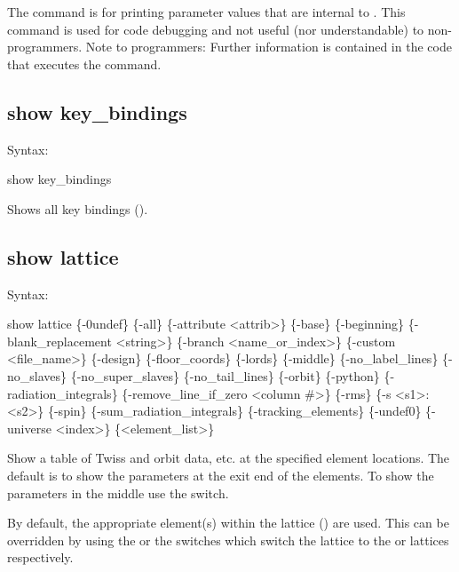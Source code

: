 {{{{{{{{The  command is for printing parameter values that are internal to \tao. This
command is used for code debugging and not useful (nor understandable) to non-programmers. Note to
programmers: Further information is contained in the code that executes the 
command.


\subsection{show key_bindings}
\label{s:show.key}

Syntax:
\begin{example}
  show key_bindings
\end{example}

Shows all key bindings ().


\subsection{show lattice}
\label{s:show.lattice}

Syntax:
\begin{example}
  show lattice \{-0undef\} \{-all\} \{-attribute <attrib>\} \{-base\} \{-beginning\}
      \{-blank_replacement <string>\}  \{-branch <name_or_index>\}
      \{-custom <file_name>\} \{-design\} \{-floor_coords\} \{-lords\} \{-middle\}
      \{-no_label_lines\} \{-no_slaves\} \{-no_super_slaves\} \{-no_tail_lines\} \{-orbit\} 
      \{-python\} \{-radiation_integrals\} \{-remove_line_if_zero <column \#>\} 
      \{-rms\} \{-s <s1>:<s2>\} \{-spin\} \{-sum_radiation_integrals\} \{-tracking_elements\} 
      \{-undef0\} \{-universe <index>\} \{<element_list>\} 
\end{example}

Show a table of Twiss and orbit data, etc. at the specified element locations. The default is to
show the parameters at the exit end of the elements. To show the parameters in the middle use the
 switch.

By default, the appropriate element(s) within the  lattice () are
used. This can be overridden by using the  or the  switches which switch the
lattice to the  or  lattices respectively.

}}}}}}}}

